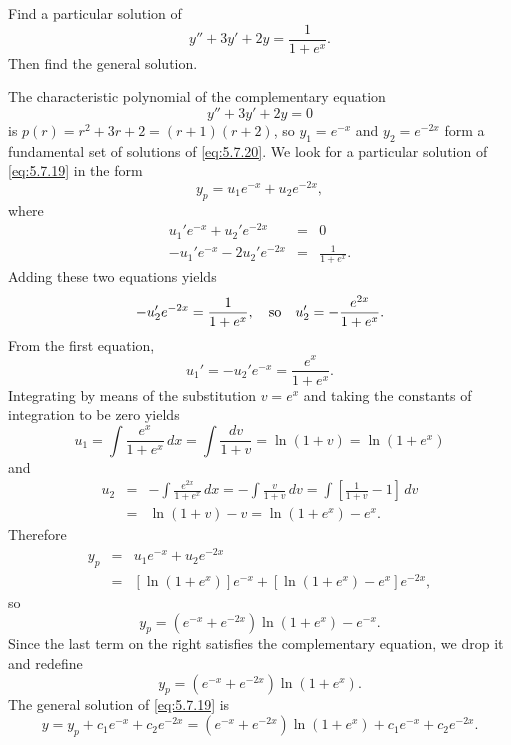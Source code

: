 \documentclass{ximera}
\begin{document}
\begin{example}\label{example:5.7.3}
 Find a particular solution of
\begin{equation}  \label{eq:5.7.19}
y''+3y'+2y=\frac{1}{1+e^x}.
\end{equation}
Then find the general solution.
 
 
\begin{explanation}
 
The characteristic polynomial of the complementary equation
\begin{equation} \label{eq:5.7.20}
y''+3y'+2y=0
\end{equation}
is $p(r)=r^2+3r+2=(r+1)(r+2)$, so
$y_1=e^{-x}$ and $y_2=e^{-2x}$ form a fundamental set of solutions of
\eqref{eq:5.7.20}.  We look for a particular solution of
\eqref{eq:5.7.19} in the form
$$
y_p=u_1e^{-x}+u_2e^{-2x},
$$
where
\begin{eqnarray*}
u_1'e^{-x}+u_2'e^{-2x}&=&0\\
-u_1'e^{-x}-2u_2'e^{-2x}&=&\frac{1}{1+e^x}.
\end{eqnarray*}
Adding these two equations yields
$$
-u_2'e^{-2x}=\frac{1}{1+e^x},\quad\mbox{so}\quad
u_2'=-{e^{2x}\over 1+e^x}.
 $$
From the first equation,
$$
u_1'=-u_2'e^{-x}=\frac{e^x}{1+e^x}.
$$
Integrating by means of  the substitution $v=e^x$ and taking the
constants of integration to be zero  yields
 $$
u_1=\int\frac{e^x}{1+e^x}\,dx=\int \frac{dv}{1+v}
=\ln(1+v)=\ln(1+e^x)
$$
and
\begin{eqnarray*}
u_2&=&-\int\frac{e^{2x}}{1+e^x}\,dx=-\int \frac{v}{1+v}\,dv
=\int\left[\frac{1}{1+v}-1\right]\,dv \\
&=&\ln(1+v)-v=\ln(1+e^x)-e^x.
\end{eqnarray*}
Therefore
\begin{eqnarray*}
y_p&=&u_1e^{-x}+u_2e^{-2x}\\
&=&[\ln(1+e^x)]e^{-x}+\left[\ln(1+e^x)-e^x\right]e^{-2x},
\end{eqnarray*}
so
$$
y_p=\left(e^{-x}+e^{-2x}\right)\ln(1+e^x)-e^{-x}.
$$
Since the last term on the right satisfies  the complementary
equation, we drop it and redefine
$$
y_p=\left(e^{-x}+e^{-2x}\right)\ln(1+e^x).
$$
The general solution of
 \eqref{eq:5.7.19} is
$$
y=y_p+c_1e^{-x}+c_2e^{-2x}=\left(e^{-x}+e^{-2x}\right)\ln(1+e^x)
+c_1e^{-x}+c_2e^{-2x}.
$$
\end{explanation}
\end{example}
 
\end{document}
